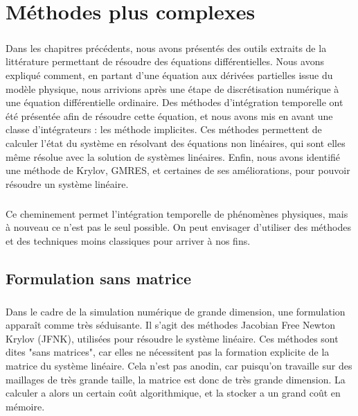 \chapter{Méthodes plus complexes}

\paragraph{}
Dans les chapitres précédents, nous avons présentés des outils extraits de la littérature permettant de résoudre des équations différentielles.
Nous avons expliqué comment, en partant d'une équation aux dérivées partielles issue du modèle physique, nous arrivions après une étape de discrétisation numérique à une équation différentielle ordinaire.
Des méthodes d'intégration temporelle ont été présentée afin de résoudre cette équation, et nous avons mis en avant une classe d'intégrateurs : les méthode implicites.
Ces méthodes permettent de calculer l'état du système en résolvant des équations non linéaires, qui sont elles même résolue avec la solution de systèmes linéaires.
Enfin, nous avons identifié une méthode de Krylov, GMRES, et certaines de ses améliorations, pour pouvoir résoudre un système linéaire.

\paragraph{}
Ce cheminement permet l'intégration temporelle de phénomènes physiques, mais à nouveau ce n'est pas le seul possible.
On peut envisager d'utiliser des méthodes et des techniques moins classiques pour arriver à nos fins.


\section{Formulation sans matrice}

  \paragraph{}
  Dans le cadre de la simulation numérique de grande dimension, une formulation apparaît comme très séduisante.
  Il s'agit des méthodes Jacobian Free Newton Krylov (JFNK), utilisées pour résoudre le système linéaire.
  Ces méthodes sont dites "sans matrices", car elles ne nécessitent pas la formation explicite de la matrice du système linéaire.
  Cela n'est pas anodin, car puisqu'on travaille sur des maillages de très grande taille, la matrice est donc de très grande dimension.
  La calculer a alors un certain coût algorithmique, et la stocker a un grand coût en mémoire.

